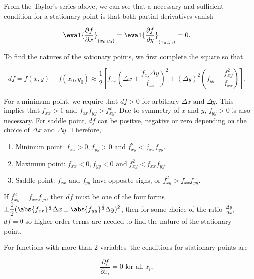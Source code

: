 \documentclass[english,a4paper,12pt]{report}
\begin{document}
From the Taylor's series above, we can see that a necessary and sufficient condition for a stationary point is that both partial derivatives vanish

\begin{equation}
    \eval{\frac{\partial f}{\partial x}}_{(x_0 ,y_0 )} = \eval{\frac{\partial f}{\partial y}}_{(x_0 ,y_0 )} =0.
\end{equation}

To find the natures of the sationary points, we first complete the square so that 

\begin{equation}
    df = f(x,y) - f(x_0 , y_0 ) \approx  \frac{1}{2} \left[ f_{xx}\left( \Delta x+ \frac{f_{xy}\Delta y }{f_{xx} }  \right)^2 + (\Delta y)^2\left( f_{yy} - \frac{f_{xy}^2 }{f_{xx} }   \right)  \right].
\end{equation}

For a minimum point, we require that \(df>0\) for arbitrary \(\Delta x \text { and } \Delta y\). This implies that \(f_{xx} >0 \text { and }  f_{xx}f_{yy} > f_{xy}^2\). Due to symmetry of \(x \text { and } y\), \(f_{y y } >0\) is also necessary. For saddle point, \(df\) can be positve, negative or zero depending on the choice of \(\Delta x \text { and } \Delta y\). Therefore,

\begin{enumerate}
    \item Minimum point: \(f_{xx} > 0, f_{yy} > 0 \text { and } f_{xy}^2 < f_{xx}f_{yy}\).
    \item Maximum point: \(f_{xx} < 0, f_{yy} < 0 \text { and } f_{xy}^2 < f_{xx}f_{yy}\).
    \item Saddle point: \(f_{xx} \text { and } f_{yy}\) have opposite signs, or \(f_{xy}^2 > f_{xx}f_{yy}\). 
\end{enumerate}

If \(f_{xy}^2 = f_{xx}f_{yy}\), then \(df\) must be one of the four forms \(\displaystyle \pm \frac{1}{2} (\abs{f_{xx} }^{\frac{1}{2} } \Delta x \pm \abs{f_{yy} }^{\frac{1}{2} }\Delta y)^2\), then for some choice of the ratio \(\displaystyle \frac{\Delta y}{\Delta x}\), \(df = 0\) so higher order terms are needed to find the nature of the stationary point. 

For functions with more than 2 variables, the conditions for stationary points are 

\begin{equation}
    \frac{\partial f}{\partial x_{i} } = 0 \text{ for all }  x_{i},
\end{equation}
\end{document}

